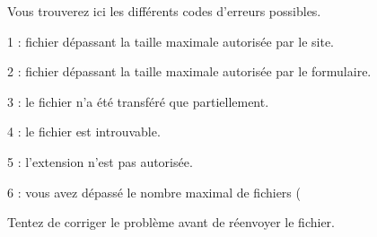 ﻿Vous trouverez ici les différents codes d'erreurs possibles.
\item 1 : fichier dépassant la taille maximale autorisée par le site.
\item 2 : fichier dépassant la taille maximale autorisée par le formulaire.
\item 3 : le fichier n'a été transféré que partiellement.
\item 4 : le fichier est introuvable.
\item 5 : l'extension n'est pas autorisée.
\item 6 : vous avez dépassé le nombre maximal de fichiers (%

Tentez de corriger le problème avant de réenvoyer le fichier.